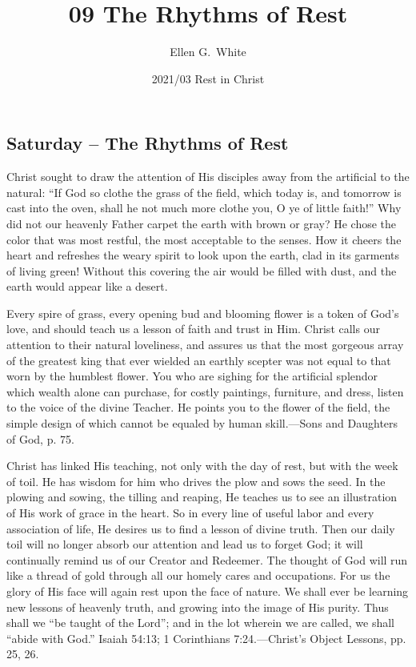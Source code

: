 \documentclass[a4paper, 10pt, twoside, headings=small]{scrartcl}
\title{09 The Rhythms of Rest}
\author{Ellen G.\ White}
\date{2021/03 Rest in Christ}
\begin{document}
\maketitle

\thispagestyle{empty}

\pagestyle{fancy}

\begin{multicols}{2}

\section*{Saturday – The Rhythms of Rest}

Christ sought to draw the attention of His disciples away from the artificial to the natural: “If God so clothe the grass of the field, which today is, and tomorrow is cast into the oven, shall he not much more clothe you, O ye of little faith!” Why did not our heavenly Father carpet the earth with brown or gray? He chose the color that was most restful, the most acceptable to the senses. How it cheers the heart and refreshes the weary spirit to look upon the earth, clad in its garments of living green! Without this covering the air would be filled with dust, and the earth would appear like a desert.

Every spire of grass, every opening bud and blooming flower is a token of God’s love, and should teach us a lesson of faith and trust in Him. Christ calls our attention to their natural loveliness, and assures us that the most gorgeous array of the greatest king that ever wielded an earthly scepter was not equal to that worn by the humblest flower. You who are sighing for the artificial splendor which wealth alone can purchase, for costly paintings, furniture, and dress, listen to the voice of the divine Teacher. He points you to the flower of the field, the simple design of which cannot be equaled by human skill.—Sons and Daughters of God, p. 75.

Christ has linked His teaching, not only with the day of rest, but with the week of toil. He has wisdom for him who drives the plow and sows the seed. In the plowing and sowing, the tilling and reaping, He teaches us to see an illustration of His work of grace in the heart. So in every line of useful labor and every association of life, He desires us to find a lesson of divine truth. Then our daily toil will no longer absorb our attention and lead us to forget God; it will continually remind us of our Creator and Redeemer. The thought of God will run like a thread of gold through all our homely cares and occupations. For us the glory of His face will again rest upon the face of nature. We shall ever be learning new lessons of heavenly truth, and growing into the image of His purity. Thus shall we “be taught of the Lord”; and in the lot wherein we are called, we shall “abide with God.” Isaiah 54:13; 1 Corinthians 7:24.—Christ’s Object Lessons, pp. 25, 26.


\end{multicols}
\end{document}
